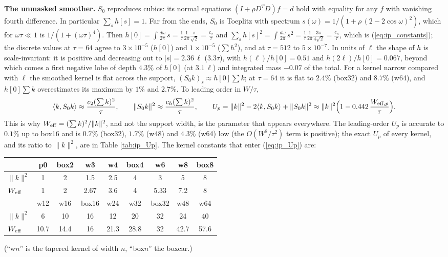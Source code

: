 \documentclass{article}
\numberwithin{equation}{section}   %
\begin{document}
{\bf The unmasked smoother.}  $S_0$ reproduces cubics: its normal equations $(I + \rho D^TD)f = d$ hold
with equality for any $f$ with vanishing fourth difference.  In particular $\sum_s h[s] = 1$.
Far from the ends, $S_0$ is Toeplitz with spectrum $s(\omega) = 1/(1 + \rho\,(2 - 2\cos\omega)^2)$, which
for $\omega\tau \ll 1$ is $1/(1 + (\omega\tau)^4)$.  Then
$h[0] = \int \frac{d\omega}{2\pi}\, s = \frac{1}{\tau}\frac{1}{2\pi}\frac{\pi}{\sqrt2} = \frac{c_2}{\tau}$ and
$\sum_s h[s]^2 = \int \frac{d\omega}{2\pi}\, s^2 = \frac{1}{\tau}\frac{1}{2\pi}\frac{3\pi}{4\sqrt2} = \frac{c_h}{\tau}$,
which is (\ref{eq:ip_constants}); the discrete values at $\tau = 64$ agree to $3 \times 10^{-5}$ ($h[0]$)
and $1 \times 10^{-5}$ ($\sum h^2$), and at $\tau = 512$ to $5 \times 10^{-7}$.  In units of $\ell$ the
shape of $h$ is scale-invariant: it is positive and decreasing out to $|s| = 2.36\,\ell$ ($3.3\tau$),
with $h(\ell)/h[0] = 0.51$ and $h(2\ell)/h[0] = 0.067$, beyond which comes a first negative lobe of depth
$4.3\%$ of $h[0]$ (at $3.1\,\ell$) and integrated mass $-0.07$ of the total.  For a kernel narrow compared
with $\ell$ the smoothed kernel is flat across the support, $(S_0 k)_s \approx h[0]\sum k$; at
$\tau = 64$ it is flat to $2.4\%$ (box32) and $8.7\%$ (w64), and $h[0]\sum k$ overestimates its maximum
by $1\%$ and $2.7\%$.  To leading order in $W/\tau$,
\begin{equation}
\langle k, S_0 k\rangle \approx \frac{c_2 (\sum k)^2}{\tau}, \qquad
\|S_0 k\|^2 \approx \frac{c_h (\sum k)^2}{\tau}, \qquad
U_p = \|k\|^2 - 2\langle k, S_0 k\rangle + \|S_0 k\|^2 \approx \|k\|^2\Big(1 - 0.442\,\frac{W_{{\rm eff},p}}{\tau}\Big) .
\label{eq:ip_Up}
\end{equation}
This is why $W_{\rm eff} = (\sum k)^2/\|k\|^2$, and not the support width, is the parameter that
appears everywhere.  The leading-order $U_p$ is accurate to $0.1\%$ up to box16 and is $0.7\%$ (box32),
$1.7\%$ (w48) and $4.3\%$ (w64) low (the $O(W^2/\tau^2)$ term is positive); the exact $U_p$ of every
kernel, and its ratio to $\|k\|^2$, are in Table \ref{tab:ip_Up}.  The kernel constants that enter
(\ref{eq:ip_Up}) are:
\begin{center}\small
\begin{tabular}{lcccccccc}
\toprule
& p0 & box2 & w3 & w4 & box4 & w6 & w8 & box8 \\
\midrule
$\|k\|^2$ & 1 & 2 & 1.5 & 2.5 & 4 & 3 & 5 & 8 \\
$W_{\rm eff}$ & 1 & 2 & 2.67 & 3.6 & 4 & 5.33 & 7.2 & 8 \\
\midrule
& w12 & w16 & box16 & w24 & w32 & box32 & w48 & w64 \\
\midrule
$\|k\|^2$ & 6 & 10 & 16 & 12 & 20 & 32 & 24 & 40 \\
$W_{\rm eff}$ & 10.7 & 14.4 & 16 & 21.3 & 28.8 & 32 & 42.7 & 57.6 \\
\bottomrule
\end{tabular}
\end{center}
(``w$n$'' is the tapered kernel of width $n$, ``box$n$'' the boxcar.)
\end{document}
